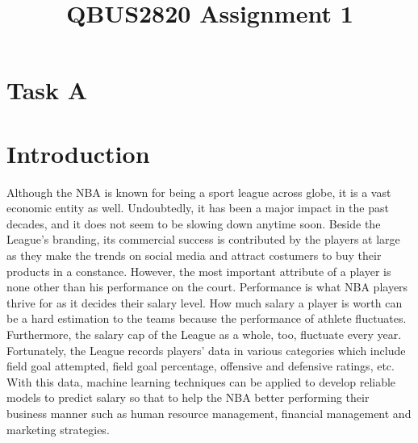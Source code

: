 \documentclass[letterpaper,12pt,twoside,]{pinp}
\title{QBUS2820 Assignment 1}
\author[]{}
\begin{document}
\verticaladjustment{-2pt}

\maketitle
\thispagestyle{firststyle}




\hypertarget{task-a}{%
\section{Task A}\label{task-a}}

\hypertarget{introduction}{%
\section{Introduction}\label{introduction}}

Although the NBA is known for being a sport league across globe, it is a
vast economic entity as well. Undoubtedly, it has been a major impact in
the past decades, and it does not seem to be slowing down anytime soon.
Beside the League's branding, its commercial success is contributed by
the players at large as they make the trends on social media and attract
costumers to buy their products in a constance. However, the most
important attribute of a player is none other than his performance on
the court. Performance is what NBA players thrive for as it decides
their salary level. How much salary a player is worth can be a hard
estimation to the teams because the performance of athlete fluctuates.
Furthermore, the salary cap of the League as a whole, too, fluctuate
every year. Fortunately, the League records players' data in various
categories which include field goal attempted, field goal percentage,
offensive and defensive ratings, etc. With this data, machine learning
techniques can be applied to develop reliable models to predict salary
so that to help the NBA better performing their business manner such as
human resource management, financial management and marketing
strategies.
\end{document}
